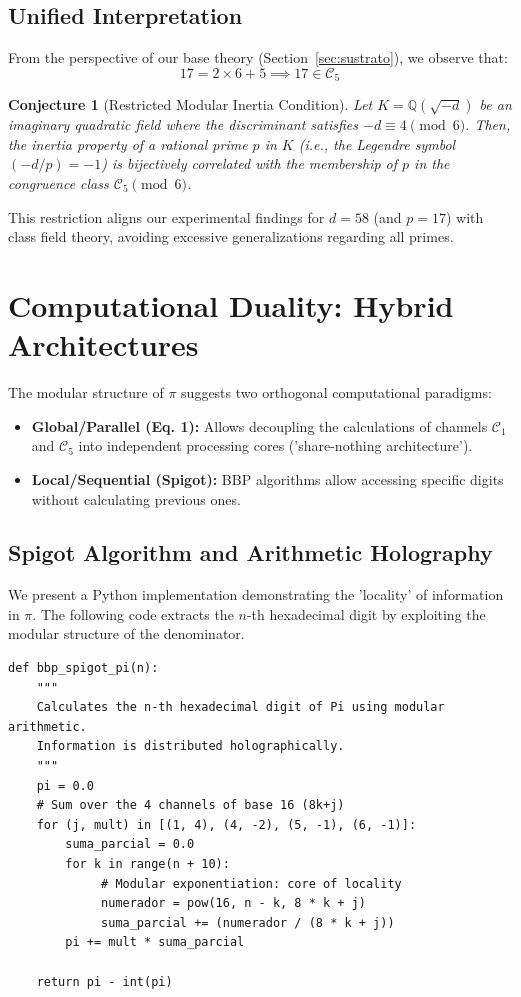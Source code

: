 \documentclass[12pt, a4paper]{article}
\theoremstyle{plain}
\newtheorem{conjecture}[theorem]{Conjecture}
\theoremstyle{definition}
\theoremstyle{remark}
\numberwithin{equation}{section}
\begin{document}
\subsection{Unified Interpretation}
From the perspective of our base theory (Section~\ref{sec:sustrato}), we observe that:
\[ 17 = 2 \times 6 + 5 \implies 17 \in \mathcal{C}_5 \]

\begin{conjecture}[Restricted Modular Inertia Condition]
Let $K = \mathbb{Q}(\sqrt{-d})$ be an imaginary quadratic field where the discriminant satisfies $-d \equiv 4 \pmod 6$. Then, the inertia property of a rational prime $p$ in $K$ (i.e., the Legendre symbol $(-d/p) = -1$) is bijectively correlated with the membership of $p$ in the congruence class $\mathcal{C}_5 \pmod 6$.
\end{conjecture}
This restriction aligns our experimental findings for $d=58$ (and $p=17$) with class field theory, avoiding excessive generalizations regarding all primes.

\section{Computational Duality: Hybrid Architectures}

The modular structure of $\pi$ suggests two orthogonal computational paradigms:
\begin{itemize}
    \item \textbf{Global/Parallel (Eq. 1):} Allows decoupling the calculations of channels $\mathcal{C}_1$ and $\mathcal{C}_5$ into independent processing cores ('share-nothing architecture').
    \item \textbf{Local/Sequential (Spigot):} BBP algorithms allow accessing specific digits without calculating previous ones.
\end{itemize}

\subsection{Spigot Algorithm and Arithmetic Holography}
We present a Python implementation demonstrating the 'locality' of information in $\pi$. The following code extracts the $n$-th hexadecimal digit by exploiting the modular structure of the denominator.

\begin{lstlisting}[caption=BBP Spigot Algorithm for Hexadecimal Extraction]
def bbp_spigot_pi(n):
    """
    Calculates the n-th hexadecimal digit of Pi using modular arithmetic.
    Information is distributed holographically.
    """
    pi = 0.0
    # Sum over the 4 channels of base 16 (8k+j)
    for (j, mult) in [(1, 4), (4, -2), (5, -1), (6, -1)]:
        suma_parcial = 0.0
        for k in range(n + 10):
             # Modular exponentiation: core of locality
             numerador = pow(16, n - k, 8 * k + j)  
             suma_parcial += (numerador / (8 * k + j))
        pi += mult * suma_parcial
        
    return pi - int(pi)
\end{lstlisting}
\end{document}
